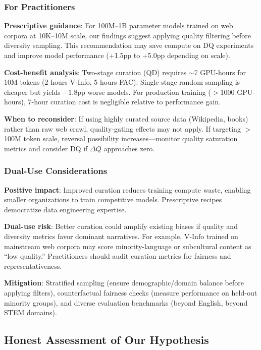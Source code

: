 \subsubsection{For Practitioners}

\textbf{Prescriptive guidance}: For 100M--1B parameter models trained on web corpora at 10K--10M scale, our findings suggest applying quality filtering before diversity sampling. This recommendation may save compute on DQ experiments and improve model performance (+1.5pp to +5.0pp depending on scale).

\textbf{Cost-benefit analysis}: Two-stage curation (QD) requires $\sim$7 GPU-hours for 10M tokens (2 hours V-Info, 5 hours FAC). Single-stage random sampling is cheaper but yields $-1.8$pp worse models. For production training ($>$1000 GPU-hours), 7-hour curation cost is negligible relative to performance gain.

\textbf{When to reconsider}: If using highly curated source data (Wikipedia, books) rather than raw web crawl, quality-gating effects may not apply. If targeting $>$100M token scale, reversal possibility increases---monitor quality saturation metrics and consider DQ if $\Delta Q$ approaches zero.

\subsubsection{Dual-Use Considerations}

\textbf{Positive impact}: Improved curation reduces training compute waste, enabling smaller organizations to train competitive models. Prescriptive recipes democratize data engineering expertise.

\textbf{Dual-use risk}: Better curation could amplify existing biases if quality and diversity metrics favor dominant narratives. For example, V-Info trained on mainstream web corpora may score minority-language or subcultural content as ``low quality.'' Practitioners should audit curation metrics for fairness and representativeness.

\textbf{Mitigation}: Stratified sampling (ensure demographic/domain balance before applying filters), counterfactual fairness checks (measure performance on held-out minority groups), and diverse evaluation benchmarks (beyond English, beyond STEM domains).

\subsection{Honest Assessment of Our Hypothesis}

